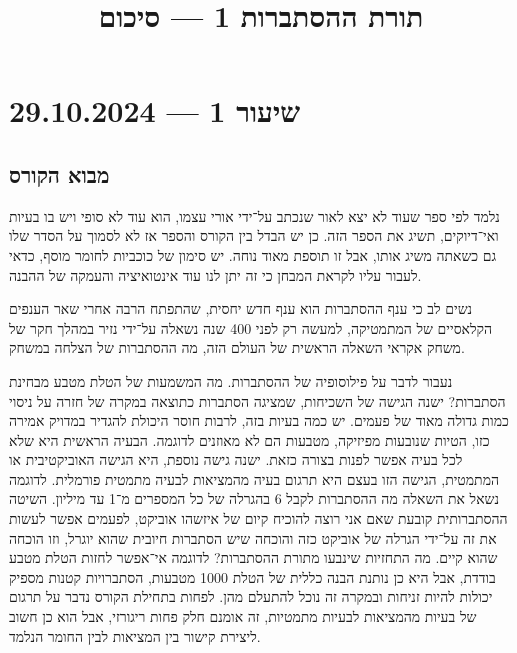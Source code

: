 
\title{תורת ההסתברות 1 --- סיכום}
\setcounter{secnumdepth}{2}

\hypersetup{}

\maketitle
\maketitleprint{}

\tableofcontents

\section{שיעור 1 --- 29.10.2024}

\subsection{מבוא הקורס}
נלמד לפי ספר שעוד לא יצא לאור שנכתב על־ידי אורי עצמו, הוא עוד לא סופי ויש בו בעיות ואי־דיוקים, תשיג את הספר הזה.
כן יש הבדל בין הקורס והספר אז לא לסמוך על הסדר שלו גם כשאתה משיג אותו, אבל זו תוספת מאוד נוחה.
יש סימון של כוכביות לחומר מוסף, כדאי לעבור עליו לקראת המבחן כי זה יתן לנו עוד אינטואיציה והעמקה של ההבנה.

נשים לב כי ענף ההסתברות הוא ענף חדש יחסית, שהתפתח הרבה אחרי שאר הענפים הקלאסיים של המתמטיקה, למעשה רק לפני 400 שנה נשאלה על־ידי נזיר במהלך חקר של משחק אקראי השאלה הראשית של העולם הזה, מה ההסתברות של הצלחה במשחק.

נעבור לדבר על פילוסופיה של ההסתברות.
מה המשמעות של הטלת מטבע מבחינת הסתברות?
ישנה הגישה של השכיחות, שמציגה הסתברות כתוצאה במקרה של חזרה על ניסוי כמות גדולה מאוד של פעמים.
יש כמה בעיות בזה, לרבות חוסר היכולת להגדיר במדויק אמירה כזו, הטיות שנובעות מפיזיקה, מטבעות הם לא מאוזנים לדוגמה.
הבעיה הראשית היא שלא לכל בעיה אפשר לפנות בצורה כזאת.
ישנה גישה נוספת, היא הגישה האוביקטיבית או המתמטית, הגישה הזו בעצם היא תרגום בעיה מהמציאות לבעיה מתמטית פורמלית.
לדוגמה נשאל את השאלה מה ההסתברות לקבל 6 בהגרלה של כל המספרים מ־1 עד מיליון.
השיטה ההסתברותית קובעת שאם אני רוצה להוכיח קיום של איזשהו אוביקט, לפעמים אפשר לעשות את זה על־ידי הגרלה של אוביקט כזה והוכחה שיש הסתברות חיובית שהוא יוגרל, וזו הוכחה שהוא קיים.
מה התחזיות שינבעו מתורת ההסתברות? לדוגמה אי־אפשר לחזות הטלת מטבע בודדת, אבל היא כן נותנת הבנה כללית של הטלת 1000 מטבעות, הסתברויות קטנות מספיק יכולות להיות זניחות ובמקרה זה נוכל להתעלם מהן.
לפחות בתחילת הקורס נדבר על תרגום של בעיות מהמציאות לבעיות מתמטיות, זה אומנם חלק פחות ריגורזי, אבל הוא כן חשוב ליצירת קישור בין המציאות לבין החומר הנלמד.

